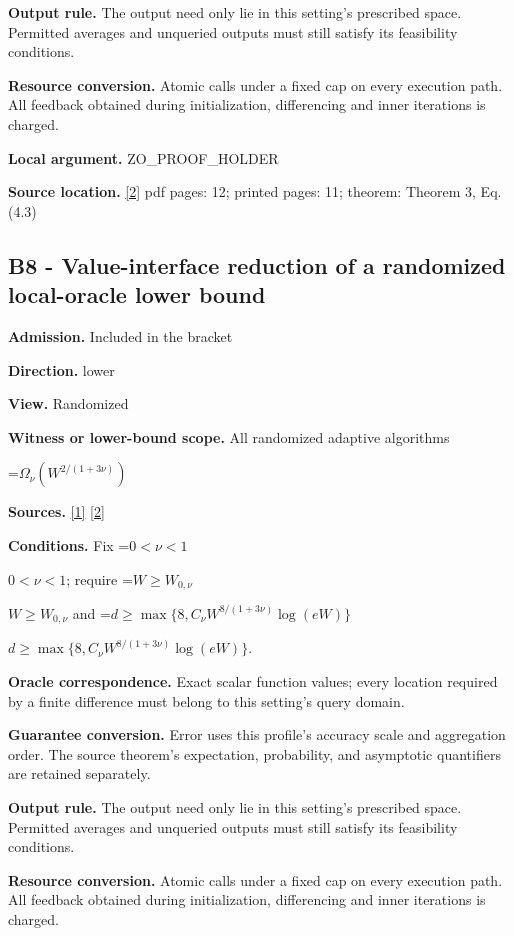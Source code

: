 \documentclass[10pt,a4paper]{article}
\newcommand{\AtlasMath}[1]{\par\begingroup\centering\setbox0=\hbox{$\displaystyle #1$}\ifdim\wd0>1.4\linewidth\typeout{ATLAS WIDE FORMULA: \the\wd0}\fi\ifdim\wd0>\linewidth\resizebox{\linewidth}{!}{\box0}\else\box0\fi\par\endgroup}
\newcommand{\AtlasInlineMath}[1]{\begingroup\setbox0=\hbox{$#1$}\ifdim\wd0>.4\linewidth\endgroup\AtlasMath{#1}\else\endgroup$#1$\fi}
\begin{document}
\textbf{Output rule.} The output need only lie in this setting's prescribed space. Permitted averages and unqueried outputs must still satisfy its feasibility conditions.

\textbf{Resource conversion.} Atomic calls under a fixed cap on every execution path. All feedback obtained during initialization, differencing and inner iterations is charged.

\textbf{Local argument.} ZO\_\allowbreak{}PROOF\_\allowbreak{}HOLDER

\textbf{Source location.} \href{https://optimization-online.org/wp-content/uploads/2013/04/3833.pdf}{[2]} pdf pages: 12; printed pages: 11; theorem: Theorem 3, Eq.(4.3)

\subsection{B8 - Value-interface reduction of a randomized local-oracle lower bound}
\textbf{Admission.} Included in the bracket

\textbf{Direction.} lower

\textbf{View.} Randomized

\textbf{Witness or lower-bound scope.} All randomized adaptive algorithms

\AtlasMath{\Omega_\nu(W^{2/(1+3\nu)})}
\textbf{Sources.} \href{https://proceedings.mlr.press/v99/diakonikolas19c/diakonikolas19c.pdf}{[1]} \href{https://optimization-online.org/wp-content/uploads/2013/04/3833.pdf}{[2]}

\textbf{Conditions.} Fix \AtlasInlineMath{0<\nu<1}; require \AtlasInlineMath{W\ge W_{0,\nu}} and \AtlasInlineMath{d\ge\max\{8,C_\nu W^{8/(1+3\nu)}\log(eW)\}}.

\textbf{Oracle correspondence.} Exact scalar function values; every location required by a finite difference must belong to this setting's query domain.

\textbf{Guarantee conversion.} Error uses this profile's accuracy scale and aggregation order. The source theorem's expectation, probability, and asymptotic quantifiers are retained separately.

\textbf{Output rule.} The output need only lie in this setting's prescribed space. Permitted averages and unqueried outputs must still satisfy its feasibility conditions.

\textbf{Resource conversion.} Atomic calls under a fixed cap on every execution path. All feedback obtained during initialization, differencing and inner iterations is charged.
\end{document}
